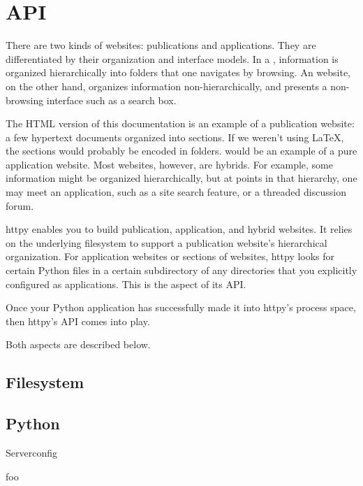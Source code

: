 \chapter{API}

There are two kinds of websites: publications and applications. They are
differentiated by their organization and interface models. In a
, information is organized hierarchically into folders that one
navigates by browsing. An  website, on the other hand,
organizes information non-hierarchically, and presents a non-browsing interface
such as a search box.

The HTML version of this documentation is an example of a publication website: a
few hypertext documents organized into sections. If we weren't using \LaTeX, the
sections would probably be encoded in folders.
 would be an example of a pure
application website. Most websites, however, are hybrids. For example, some
information might be organized hierarchically, but at points in that hierarchy,
one may meet an application, such as a site search feature, or a threaded
discussion forum.

httpy enables you to build publication, application, and hybrid websites. It
relies on the underlying filesystem to support a publication website's
hierarchical organization. For application websites or sections of websites,
httpy looks for certain Python files in a certain subdirectory of any
directories that you explicitly configured as applications. This is the
 aspect of its API.

Once your Python application has successfully made it into httpy's process
space, then httpy's  API comes into play.

Both aspects are described below.

\section{Filesystem}

\section{Python}

\begin{classdesc}{Server}{config}

foo

\end{classdesc}



